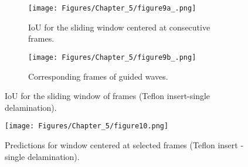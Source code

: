 \begin{figure} [!h]
	\begin{subfigure}[b]{1\textwidth}
		\centering
		\texttt{[image: Figures/Chapter\_5/figure9a\_.png]}
		\caption{IoU for the sliding window centered at consecutive frames.}
		\label{fig:CFRP_Teflon_3o_IoU_}
	\end{subfigure}
	\begin{subfigure}[b]{1\textwidth}
		\centering
		\texttt{[image: Figures/Chapter\_5/figure9b\_.png]}
		\caption{Corresponding frames of guided waves.} 
		\label{fig:CFRP_teflon_3o_shapes_}
	\end{subfigure}
	\caption{IoU for the sliding window of frames (Teflon insert-single delamination).}
	\label{fig:CFRP_Teflon_3o_IoU_centre_window}
\end{figure} 

\begin{figure}[!h]
	\centering
	\texttt{[image: Figures/Chapter\_5/figure10.png]}
	\caption{Predictions for window centered at selected frames (Teflon insert - single delamination).}
	\label{fig:CFRP_Teflon_3o_predictions}
\end{figure}

